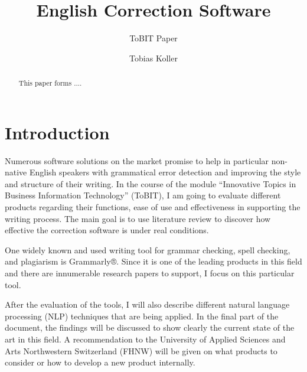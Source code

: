 \documentclass[runningheads]{llncs}
\begin{document}
\title{English Correction Software}
\subtitle{ToBIT Paper}

\author{Tobias Koller}



\maketitle              %


\begin{abstract}
This paper forms ....

\end{abstract}



\section{Introduction}
Numerous software solutions on the market promise to help in particular non-native English speakers with grammatical error detection and improving the style and structure of their writing. In the course of the module ``Innovative Topics in Business Information Technology'' (ToBIT), I am going to evaluate different products regarding their functions, ease of use and effectiveness in supporting the writing process. The main goal is to use literature review to discover how effective the correction software is under real conditions.

One widely known and used writing tool for grammar checking, spell checking, and plagiarism is Grammarly®. Since it is one of the leading products in this field and there are innumerable research papers to support, I focus on this particular tool.

After the evaluation of the tools, I will also describe different natural language processing (NLP) techniques that are being applied. In the final part of the document, the findings will be discussed to show clearly the current state of the art in this field. A recommendation to the University of Applied Sciences and Arts Northwestern Switzerland (FHNW) will be given on what products to consider or how to develop a new product internally.
\end{document}
